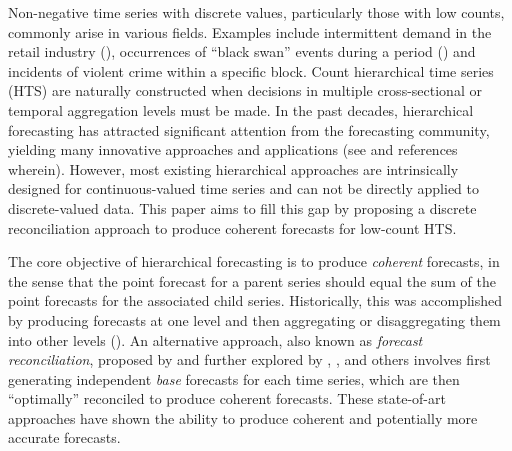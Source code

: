\documentclass[a4paper,review,12pt,authoryear]{elsarticle}
\theoremstyle{definition}
\begin{document}
Non-negative time series with discrete values, particularly those with low counts, commonly arise in various fields.
Examples include intermittent demand in the retail industry (\citealp{kourentzesElucidateStructureIntermittent2021}), occurrences of ``black swan'' events during a period (\citealp{nikolopoulosWeNeedTalk2020}) and incidents of violent crime within a specific block.
Count hierarchical time series (HTS) are naturally constructed when decisions in multiple cross-sectional or temporal aggregation levels must be made.
In the past decades, hierarchical forecasting has attracted significant attention from the forecasting community, yielding many innovative approaches and applications (see \citealp{athanasopoulosForecastReconciliationReview2023} and references wherein).
However, most existing hierarchical approaches are intrinsically designed for continuous-valued time series and can not be directly applied to discrete-valued data.
This paper aims to fill this gap by proposing a discrete reconciliation approach to produce coherent forecasts for low-count HTS.

The core objective of hierarchical forecasting is to produce \textit{coherent} forecasts,
in the sense that the point forecast for a parent series should equal the sum of the point forecasts for the associated child series. Historically, this was accomplished by producing forecasts at one level
and then aggregating or disaggregating them into other levels (\citealp{fliednerHierarchicalForecastingIssues2001}).
An alternative approach, also known as \textit{forecast reconciliation}, proposed by \cite{hyndmanOptimalCombinationForecasts2011} and further explored by \cite{wickramasuriyaOptimalForecastReconciliation2019}, \cite{panagiotelisForecastReconciliationGeometric2021}, and others involves
first generating independent \textit{base} forecasts for each time series,
which are then ``optimally'' reconciled to produce coherent forecasts. These state-of-art approaches have shown the ability to produce coherent and potentially more accurate forecasts.
\end{document}
